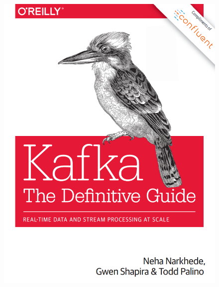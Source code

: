 \begin{frame}
\begin{figure}[ht]
\begin{minipage}[c][1\width]{
		0.3\textwidth}
	\includegraphics[width=\linewidth]{./Figures/chapter-00/kafka-tdg.png}
\end{minipage}

\end{figure}


\end{frame}


%

